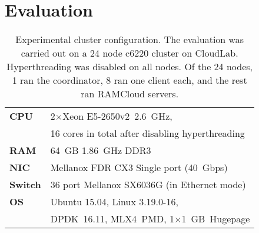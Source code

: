 \section{Evaluation}
\label{sec:reval}

\begin{table}[t]
\caption{Experimental cluster configuration. The evaluation was
carried out on a 24 node c6220 cluster on CloudLab. Hyperthreading was
disabled on all nodes. Of the 24 nodes, 1
ran the coordinator, 8 ran one client each, and the rest ran
RAMCloud servers.
}
\centering
\small
\begin{tabular}{p{} p{}}
\toprule
\textbf{CPU} & 2$\times$Xeon E5-2650v2~2.6~GHz,\\
        & 16 cores in total after disabling hyperthreading
\\
\midrule
\textbf{RAM} & 64~GB 1.86~GHz DDR3
\\
\midrule
\textbf{NIC} & Mellanox FDR CX3 Single port (40~Gbps)
\\
\midrule
\textbf{Switch} & 36 port Mellanox SX6036G (in Ethernet mode)
\\
\midrule
\textbf{OS} & Ubuntu 15.04, Linux 3.19.0-16,\\
        & DPDK~16.11, MLX4~PMD, 1$\times$1~GB~Hugepage
\\
\bottomrule
\end{tabular}
\label{table:exptconfig}
\end{table}

